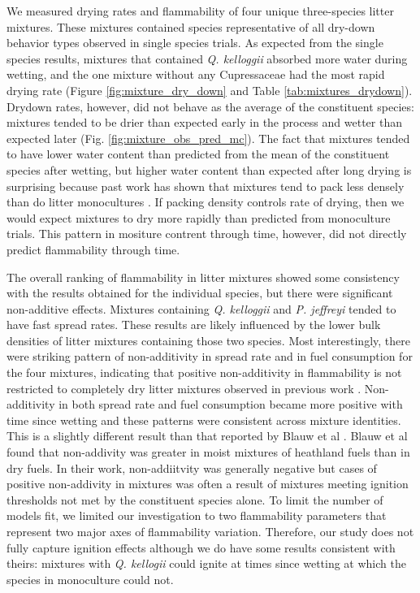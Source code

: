 \documentclass[fire,article,submit,moreauthors,pdftex]{Definitions/mdpi}
\begin{document}
We measured drying rates and flammability of four unique three-species litter mixtures. These mixtures contained species representative of all dry-down behavior types observed in single species trials. As expected from the single species results, mixtures that contained \emph{Q. kelloggii} absorbed more water during wetting, and the one mixture without any Cupressaceae had the most rapid drying rate (Figure \ref{fig:mixture_dry_down} and Table \ref{tab:mixtures_drydown}). Drydown rates, however, did not behave as the average of the constituent species: mixtures tended to be drier than expected early in the process and wetter than expected later (Fig. \ref{fig:mixture_obs_pred_mc}). The fact that mixtures tended to have lower water content than predicted from the mean of the constituent species after wetting, but higher water content than expected after long drying is surprising because past work has shown that
mixtures tend to pack less densely than do litter monocultures \cite[][, Table 2]{Magalhaes+Schwilk-2012}. If packing density controls rate of drying, then we would expect mixtures to dry more rapidly than predicted from monoculture trials. This pattern in mositure contrent through time, however, did not directly predict flammability through time.


The overall ranking of flammability in litter mixtures showed some consistency
with the results obtained for the individual species, but there were
significant non-additive effects. Mixtures containing \emph{Q. kelloggii} and
\emph{P. jeffreyi} tended to have fast spread rates. These results are likely
influenced by the lower bulk densities of litter mixtures containing those two
species. Most interestingly, there were striking pattern of non-additivity in
spread rate and in fuel consumption for the four mixtures, indicating that
positive non-additivity in flammability is not restricted to completely dry
litter mixtures observed in previous work \citep{Magalhaes+Schwilk-2012,
  VanAltena+Logtestjin+etal-2012}. Non-additivity in both spread rate and fuel
consumption became more positive with time since wetting and these patterns
were consistent across mixture identities. This is a slightly different result
than that reported by Blauw et al \citeyear{Blauw+Wensink+etal-2015}. Blauw et
al found that non-addivity was greater in moist mixtures of heathland fuels
than in dry fuels. In their work, non-addiitvity was generally negative but cases of 
positive non-addivity in mixtures was often a result of mixtures meeting
ignition thresholds not met by the constituent species alone. To limit the
number of models fit, we limited our investigation to two flammability
parameters that represent two major axes of flammability variation. Therefore,
our study does not fully capture ignition effects although we do have some
results consistent with theirs: mixtures with \emph{Q. kellogii} could ignite
at times since wetting at which the species in monoculture could not.
\end{document}
